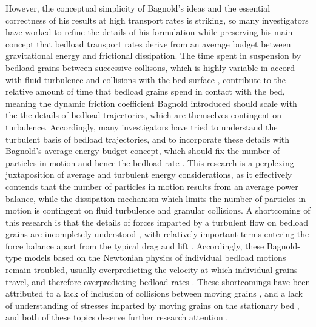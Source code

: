\documentclass{article}
\begin{document}
However, the conceptual simplicity of Bagnold's ideas and the essential correctness of his results at high transport rates is striking, so many investigators have worked to refine the details of his formulation while preserving his main concept that bedload transport rates derive from an average budget between gravitational energy and frictional dissipation. 
The time spent in suspension by bedload grains between successive collisons, which is highly variable in accord with fluid turbulence and collisions with the bed surface \citep{Bialik2015}, contribute to the relative amount of time that bedload grains spend in contact with the bed, meaning the dynamic friction coefficient Bagnold introduced should scale with the the details of bedload trajectories, which are themselves contingent on turbulence. 
Accordingly, many investigators have tried to understand the turbulent basis of bedload trajectories, and to incorporate these details with Bagnold's average energy budget concept, which should fix the number of particles in motion and hence the bedload rate \citep{Abbott1977, Bridge1984, Wiberg1989, Bridge1992, Nino1998}.
This research is a perplexing juxtaposition of average and turbulent energy considerations, as it effectively contends that the number of particles in motion results from an average power balance, while the dissipation mechanism which limits the number of particles in motion is contingent on fluid turbulence and granular collisions. 
A shortcoming of this research is that the details of forces imparted by a turbulent flow on bedload grains are incompletely understood \citep{Maxey1986, Schmeeckle2007, Dwivedi2010, Dwivedi2011}, with relatively important terms entering the force balance apart from the typical drag and lift \citep{Bialik2015}.
Accordingly, these Bagnold-type models based on the Newtonian physics of individual bedload motions remain troubled, usually overpredicting the velocity at which individual grains travel, and therefore overpredicting bedload rates \citep{Bridge1984, Bialik2015}. 
These shortcomings have been attributed to a lack of inclusion of collisions between moving grains \citep{Lee2002}, and a lack of understanding of stresses imparted by moving grains on the stationary bed \citep{Nino1998}, and both of these topics deserve further research attention \citep{Bialik2015}.  
\end{document}
